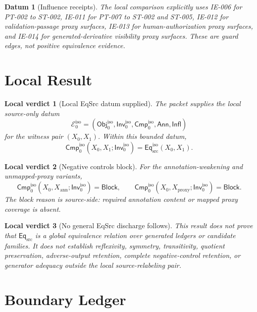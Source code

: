 \documentclass[11pt]{article}
\newcommand{\Obj}{\mathsf{Obj}_{0}^{\mathrm{iso}}}
\newcommand{\Inv}{\mathsf{Inv}_{0}^{\mathrm{iso}}}
\newcommand{\Cmp}{\mathsf{Cmp}_{0}^{\mathrm{iso}}}
\newcommand{\EqSrc}{\mathsf{Eq}_{\mathrm{src}}}
\newcommand{\EqIso}{\mathsf{Eq}_{\mathrm{src}}^{\mathrm{iso}}}
\newcommand{\Annot}{\mathsf{Ann}}
\newcommand{\Influence}{\mathsf{Infl}}
\newcommand{\Block}{\mathsf{Block}}
\newtheorem{datum}{Datum}
\newtheorem{verdict}{Local verdict}
\begin{document}
\begin{datum}[Influence receipts]
The local comparison explicitly uses IE-006 for PT-002 to ST-002,
IE-011 for PT-007 to ST-002 and ST-005, IE-012 for validation-passage
proxy surfaces, IE-013 for human-authorization proxy surfaces, and IE-014
for generated-derivative visibility proxy surfaces. These are guard edges,
not positive equivalence evidence.
\end{datum}

\section{Local Result}

\begin{verdict}[Local EqSrc datum supplied]
The packet supplies the local source-only datum
\[
    \mathcal{E}_{0}^{\mathrm{iso}} =
    (\Obj,\Inv,\Cmp,\Annot,\Influence)
\]
for the witness pair \((X_{0},X_{1})\). Within this bounded datum,
\[
    \Cmp(X_{0},X_{1};\Inv)=\EqIso(X_{0},X_{1}).
\]
\end{verdict}

\begin{verdict}[Negative controls block]
For the annotation-weakening and unmapped-proxy variants,
\[
    \Cmp(X_{0},X_{\mathrm{ann}};\Inv)=\Block,\qquad
    \Cmp(X_{0},X_{\mathrm{proxy}};\Inv)=\Block.
\]
The block reason is source-side: required annotation content or mapped
proxy coverage is absent.
\end{verdict}

\begin{verdict}[No general EqSrc discharge follows]
This result does not prove that \(\EqSrc\) is a global equivalence relation
over generated ledgers or candidate families. It does not establish
reflexivity, symmetry, transitivity, quotient preservation, adverse-output
retention, complete negative-control retention, or generator adequacy
outside the local source-relabeling pair.
\end{verdict}

\section{Boundary Ledger}
\end{document}
